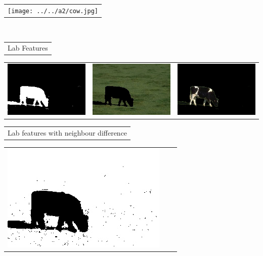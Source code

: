 \documentclass{article}
\begin{document}
\begin{center}
\begin{tabular}{c}
\texttt{[image: ../../a2/cow.jpg]}
\end{tabular}
\\
\begin{tabular}{c}

Lab Features \\
\end{tabular}
 \begin{tabular}{c c c} 

 \includegraphics[width=0.37\linewidth]{../image-segmentation/output/Lab/cow_mask.jpg} & 
 
 \includegraphics[width=.37\linewidth]{../image-segmentation/output/Lab/cow_seg1.jpg} & \includegraphics[width=.37\linewidth]{../image-segmentation/output/Lab/cow_seg2.jpg} \\
  
 \end{tabular}
 \begin{tabular}{c}

Lab features with neighbour difference \\
\end{tabular}
 \begin{tabular}{c c c} 

 \includegraphics[width=.37\linewidth]{../image-segmentation/output/add-Lab-neighbor-diff-feature/cow_mask.jpg} & 
 

\end{tabular}
\end{center}
\end{document}
